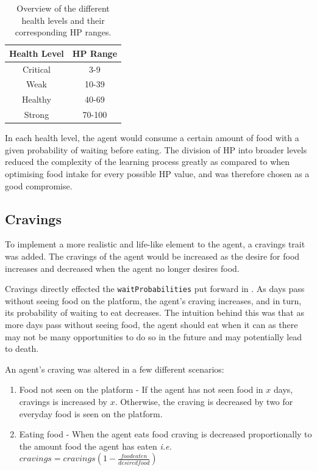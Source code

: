 \begin{table}[htb]
    \centering
    \begin{tabular}{| c | c |}
    \hline
    Health Level & HP Range \\
    \hline
    \hline
     Critical & 3-9 \\ 
    \hline
     Weak &  10-39\\  
     \hline
     Healthy &  40-69\\
     \hline
     Strong & 70-100 \\
     \hline
    \end{tabular}
    \caption{Overview of the different health levels and their corresponding HP ranges.}
    \label{tab:healthLevels}
\end{table}

In each health level, the agent would consume a certain amount of food with a given probability of waiting before eating. The division of HP into broader levels reduced the complexity of the learning process greatly as compared to when optimising food intake for every possible HP value, and was therefore chosen as a good compromise.

\subsection{Cravings}

To implement a more realistic and life-like element to the agent, a cravings trait was added. The cravings of the agent would be increased as the desire for food increases and decreased when the agent no longer desires food.

Cravings directly effected the \texttt{waitProbabilities} put forward in . As days pass without seeing food on the platform, the agent's craving increases, and in turn, its probability of waiting to eat decreases. The intuition behind this was that as more days pass without seeing food, the agent should eat when it can as there may not be many opportunities to do so in the future and may potentially lead to death.\newline

An agent's craving was altered in a few different scenarios:
\begin{enumerate}
    \item Food not seen on the platform - If the agent has not seen food in $x$ days, cravings is increased by $x$. Otherwise, the craving is decreased by two for everyday food is seen on the platform. 
    \item Eating food - When the agent eats food craving is decreased proportionally to the amount food the agent has eaten \emph{i.e.} $cravings = cravings (1 - \frac{foodeaten}{desiredfood})$
\end{enumerate}

